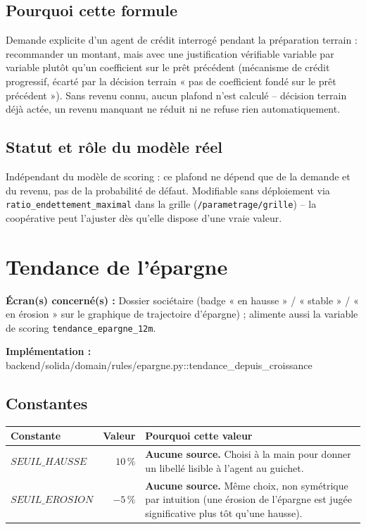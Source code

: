 \documentclass[11pt,a4paper]{article}
\newcommand{\brk}{\allowbreak}
\newcommand{\ecran}[1]{\noindent\textbf{Écran(s) concerné(s) :} #1\par}
\newcommand{\fichier}[1]{\noindent\textbf{Implémentation :} \tiny\ttfamily#1\normalfont\normalsize\par}
\begin{document}
\subsection*{Pourquoi cette formule}
Demande explicite d'un agent de crédit interrogé pendant la préparation terrain : recommander un
montant, mais avec une justification vérifiable variable par variable plutôt qu'un coefficient
sur le prêt précédent (mécanisme de crédit progressif, écarté par la décision terrain
« pas de coefficient fondé sur le prêt précédent »). Sans revenu connu, aucun plafond n'est
calculé -- décision terrain déjà actée, un revenu manquant ne réduit ni ne refuse rien
automatiquement.

\subsection*{Statut et rôle du modèle réel}
Indépendant du modèle de scoring : ce plafond ne dépend que de la demande et du revenu, pas de
la probabilité de défaut. Modifiable sans déploiement via \texttt{ratio\_endettement\_maximal}
dans la grille (\texttt{/parametrage/grille}) -- la coopérative peut l'ajuster dès qu'elle
dispose d'une vraie valeur.

\newpage

\section{Tendance de l'épargne}
\label{sec:epargne}

\ecran{Dossier sociétaire (badge « en hausse » / « stable » / « en érosion » sur le graphique de
trajectoire d'épargne) ; alimente aussi la variable de scoring \texttt{tendance\_epargne\_12m}.}
\fichier{backend/\brk solida/\brk domain/\brk rules/\brk epargne.py::\brk{}tendance\_depuis\_croissance}

\subsection*{Constantes}

\begin{tabular}{@{}L{3.2cm}rL{6.9cm}@{}}
\toprule
Constante & Valeur & Pourquoi cette valeur \\
\midrule
$\mathit{SEUIL\_HAUSSE}$ & $10\,\%$ & \textbf{Aucune source.} Choisi à la main pour donner un
  libellé lisible à l'agent au guichet. \\
$\mathit{SEUIL\_EROSION}$ & $-5\,\%$ & \textbf{Aucune source.} Même choix, non symétrique par
  intuition (une érosion de l'épargne est jugée significative plus tôt qu'une hausse). \\
\bottomrule
\end{tabular}
\end{document}
